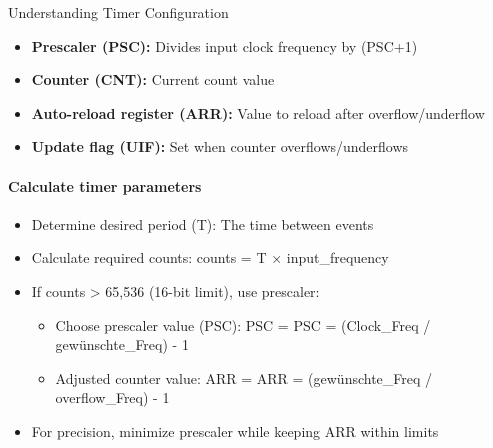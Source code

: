 \multend



\begin{concept}{Understanding Timer Configuration}
\begin{itemize}
    \item \textbf{Prescaler (PSC):} Divides input clock frequency by (PSC+1)
    \item \textbf{Counter (CNT):} Current count value
    \item \textbf{Auto-reload register (ARR):} Value to reload after overflow/underflow
    \item \textbf{Update flag (UIF):} Set when counter overflows/underflows
\end{itemize}

\paragraph{Calculate timer parameters}
\begin{itemize}
    \item Determine desired period (T): The time between events
    \item Calculate required counts: counts = T × input\_frequency
    \item If counts > 65,536 (16-bit limit), use prescaler:
    \begin{itemize}
        \item Choose prescaler value (PSC): PSC = PSC = (Clock\_Freq / gewünschte\_Freq) - 1
        \item Adjusted counter value: ARR = ARR = (gewünschte\_Freq / overflow\_Freq) - 1
    \end{itemize}
    \item For precision, minimize prescaler while keeping ARR within limits
\end{itemize}
\end{concept}


